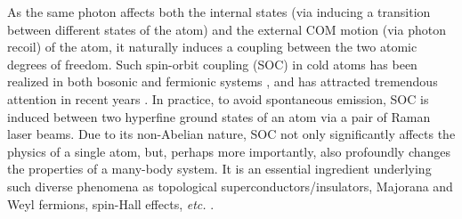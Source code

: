\documentclass[atoms,article,accept,moreauthors,pdftex,12pt,a4paper]{mdpi}
\begin{document}

As the same photon affects both the internal states (via inducing a transition between different states of the atom) and the external COM motion (via photon recoil) of the atom, it naturally induces a coupling between the two atomic degrees of freedom. Such spin-orbit coupling (SOC) in cold atoms has been realized in both bosonic \cite{soc1, soc2} and fermionic systems \cite{soc3, soc4}, and has attracted tremendous attention in recent years \cite{socVictor}. In practice, to avoid spontaneous emission, SOC is induced between two hyperfine ground states of an atom via a pair of Raman laser beams. Due to its non-Abelian nature, SOC not only significantly affects the physics of a single atom, but, perhaps more importantly, also profoundly changes the properties of a many-body system. It is an essential ingredient underlying such diverse phenomena as topological superconductors/insulators, Majorana and Weyl fermions, spin-Hall effects, \emph{etc.} \cite{TI, MF, WF, SHE1, SHE2}.
\end{document}
